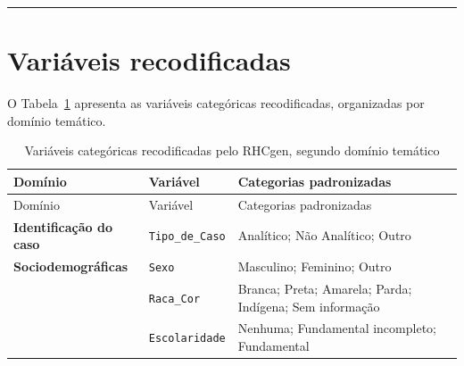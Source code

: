 \documentclass[
  brazilian,
  a4paper,
  oneside]{scrbook}
\begin{document}
\begin{center}\rule{0.5\linewidth}{0.5pt}\end{center}

\section{Variáveis recodificadas}\label{variuxe1veis-recodificadas}

O Tabela~\ref{tbl-recodificacao} apresenta as variáveis categóricas
recodificadas, organizadas por domínio temático.

\begin{longtable}[]{@{}
  >{\raggedright\arraybackslash}p{}
  >{\raggedright\arraybackslash}p{}
  >{\raggedright\arraybackslash}p{}@{}}
\caption{Variáveis categóricas recodificadas pelo RHCgen, segundo
domínio temático}\label{tbl-recodificacao}\tabularnewline
\toprule\noalign{}
\begin{minipage}[b]{\linewidth}\raggedright
Domínio
\end{minipage} & \begin{minipage}[b]{\linewidth}\raggedright
Variável
\end{minipage} & \begin{minipage}[b]{\linewidth}\raggedright
Categorias padronizadas
\end{minipage} \\
\midrule\noalign{}
\endfirsthead
\toprule\noalign{}
\begin{minipage}[b]{\linewidth}\raggedright
Domínio
\end{minipage} & \begin{minipage}[b]{\linewidth}\raggedright
Variável
\end{minipage} & \begin{minipage}[b]{\linewidth}\raggedright
Categorias padronizadas
\end{minipage} \\
\midrule\noalign{}
\endhead
\bottomrule\noalign{}
\endlastfoot
\textbf{Identificação do caso} & \texttt{Tipo\_de\_Caso} & Analítico;
Não Analítico; Outro \\
\textbf{Sociodemográficas} & \texttt{Sexo} & Masculino; Feminino;
Outro \\
& \texttt{Raca\_Cor} & Branca; Preta; Amarela; Parda; Indígena; Sem
informação \\
& \texttt{Escolaridade} & Nenhuma; Fundamental incompleto; Fundamental

\end{longtable}
\end{document}
